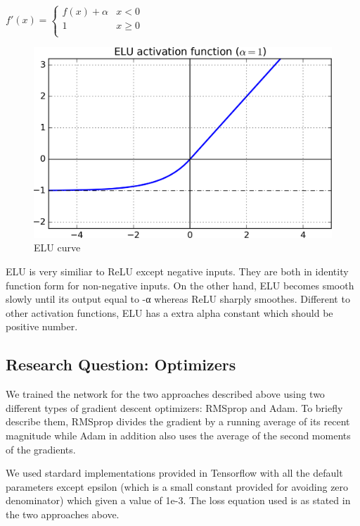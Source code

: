 \documentclass[11pt,a4paper]{article}
\begin{document}
$f'(x) = \begin{cases}
      f(x)+\alpha & x < 0 \\
      1 & x\geq 0 \\
   \end{cases}$
\begin{figure}[htb]
\begin{center}
\includegraphics[width=\columnwidth]{elu.png}
\end{center}
\caption{ELU curve}
\label{fig:figure6}
\end{figure}

ELU is very similiar to ReLU except negative inputs. They are both in identity function form for non-negative inputs. On the other hand, ELU becomes smooth slowly until its output equal to -α whereas ReLU sharply smoothes. Different to other activation functions, ELU has a extra alpha constant which should be positive number.

\subsection{Research Question: Optimizers}
We trained the network for the two approaches described above using two different types of gradient descent optimizers: RMSprop and Adam. To briefly describe them, RMSprop divides the gradient by a running average of its recent magnitude while Adam in addition also uses the average of the second moments of the gradients.

We used stardard implementations provided in Tensorflow with all the default parameters except epsilon (which is a small constant provided for avoiding zero denominator) which given a value of 1e-3. The loss equation used is as stated in the two approaches above.
\end{document}

